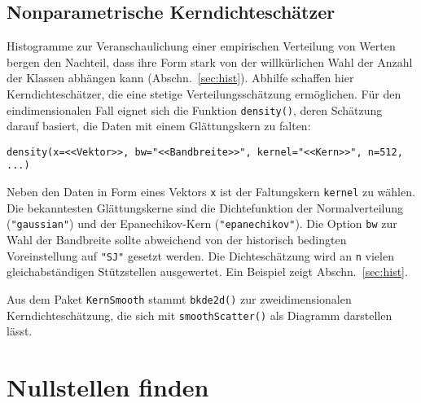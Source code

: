 \subsection{Nonparametrische Kerndichteschätzer}
\label{sec:density}

Histogramme zur Veranschaulichung einer empirischen Verteilung von Werten bergen den Nachteil, dass ihre Form stark von der willkürlichen Wahl der Anzahl der Klassen abhängen kann (Abschn.\ \ref{sec:hist}). Abhilfe schaffen hier Kerndichteschätzer, die eine stetige Verteilungsschätzung ermöglichen. Für den eindimensionalen Fall eignet sich die Funktion \lstinline!density()!, deren Schätzung darauf basiert, die Daten mit einem Glättungskern zu falten:
\begin{lstlisting}
density(x=<<Vektor>>, bw="<<Bandbreite>>", kernel="<<Kern>>", n=512, ...)
\end{lstlisting}

Neben den Daten in Form eines Vektors \lstinline!x! ist der Faltungskern \lstinline!kernel! zu wählen. Die bekanntesten Glättungskerne sind die Dichtefunktion der Normalverteilung (\lstinline!"gaussian"!) und der Epanechikov-Kern (\lstinline!"epanechikov"!). Die Option \lstinline!bw! zur Wahl der Bandbreite sollte abweichend von der historisch bedingten Voreinstellung auf \lstinline!"SJ"! gesetzt werden. Die Dichteschätzung wird an \lstinline!n! vielen gleichabständigen Stützstellen ausgewertet. Ein Beispiel zeigt Abschn.\ \ref{sec:hist}.

Aus dem Paket \lstinline!KernSmooth! stammt \lstinline!bkde2d()! zur zweidimensionalen Kerndichteschätzung, die sich mit \lstinline!smoothScatter()! als Diagramm darstellen lässt.

\section{Nullstellen finden}
\label{sec:uniroot}

